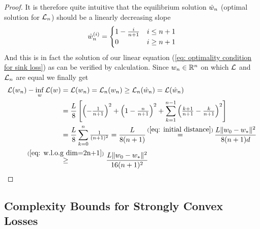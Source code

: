 \begin{proof}
	It is therefore quite intuitive that the equilibrium solution
	\(\hat{w}_n\) (optimal solution for \(\mathcal{L}_n\)) should be a linearly
	decreasing slope
	\begin{align*}
		\hat{w}_n^{(i)} = \begin{cases}
			1 - \tfrac{i}{n+1} & i \le n+1\\
			0	& i \ge n+1
		\end{cases}
	\end{align*}	
	And this is in fact the solution of our linear equation (\ref{eq: optimality
	condition for sink loss}) as can be verified by calculation. Since
	\(w_n \in \mathbb{R}^n\) on which \(\mathcal{L}\) and \(\mathcal{L}_n\) are equal
	we finally get
	\begin{align*}
		\Loss(\weights_n)-\inf_\weights\Loss(\weights)
		&=\Loss(\weights_n) = \Loss_n(\weights_n) \ge \Loss_n(\hat{\weights}_n)
		= \Loss(\hat{\weights}_n)\\
		&= \frac{\ubound}{8}\left[
			\left(-\tfrac1{n+1}\right)^2 + \left(1-\tfrac{n}{n+1}\right)^2
			+ \sum_{k=1}^{n-1}\left(\tfrac{k+1}{n+1}-\tfrac{k}{n+1}\right)^2
		\right]\\
		&= \frac{\ubound}{8}\sum_{k=0}^n \tfrac{1}{(n+1)^2}
		=\frac{\ubound}{8(n+1)}
		\xeq{(\ref{eq: initial distance})} \frac{L\|\weights_0 - \minimum\|^2}{8(n+1)d}\\
		&\lxge{(\ref{eq: w.l.o.g dim=2n+1})}
		\frac{L\|\weights_0 - \minimum\|^2}{16(n+1)^2}
		\qedhere
	\end{align*}
\end{proof}


\subsection{Complexity Bounds for Strongly Convex Losses}

